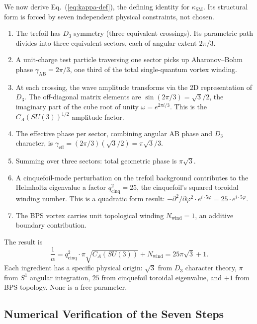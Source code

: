 \documentclass[11pt]{article}
\newcommand{\CA}{C_A}
\newcommand{\ksm}{\kappa_\text{SM}}
\begin{document}
We now derive Eq.~(\ref{eq:kappa-def}), the defining identity
for $\ksm$.  Its structural form is forced by seven independent
physical constraints, not chosen.

\begin{enumerate}
\item
  The trefoil has $D_3$ symmetry (three equivalent crossings).
  Its parametric path divides into three equivalent sectors, each
  of angular extent $2\pi/3$.
\item
  A unit-charge test particle traversing one sector picks up
  Aharonov--Bohm phase $\gamma_\text{AB} = 2\pi/3$, one third of the
  total single-quantum vortex winding.
\item
  At each crossing, the wave amplitude transforms via the 2D
  representation of $D_3$.  The off-diagonal matrix elements are
  $\sin(2\pi/3) = \sqrt{3}/2$, the imaginary part of the cube root
  of unity $\omega = e^{2\pi i/3}$.  This is the $\CA(SU(3))^{1/2}$
  amplitude factor.
\item
  The effective phase per sector, combining angular AB phase and
  $D_3$ character, is $\gamma_\text{eff} = (2\pi/3)(\sqrt{3}/2)
  = \pi\sqrt{3}/3$.
\item
  Summing over three sectors: total geometric phase is
  $\pi\sqrt{3}$.
\item
  A cinquefoil-mode perturbation on the trefoil background
  contributes to the Helmholtz eigenvalue a factor
  $q^2_\text{cinq} = 25$, the cinquefoil's squared toroidal
  winding number.  This is a quadratic form result:
  $-\partial^2/\partial\varphi^2 \cdot e^{i\cdot 5\varphi}
  = 25 \cdot e^{i\cdot 5\varphi}$.
\item
  The BPS vortex carries unit topological winding $N_\text{wind}=1$,
  an additive boundary contribution.
\end{enumerate}

The result is
\begin{equation}
  \frac{1}{\alpha} = q_\text{cinq}^2 \cdot \pi \sqrt{\CA(SU(3))}
  + N_\text{wind} = 25\pi\sqrt{3} + 1.
\end{equation}
Each ingredient has a specific physical origin:
$\sqrt{3}$ from $D_3$ character theory, $\pi$ from $S^1$
angular integration, $25$ from cinquefoil toroidal eigenvalue, and
$+1$ from BPS topology.  None is a free parameter.

\subsection{Numerical Verification of the Seven Steps}
\label{sec:ab-verification}
\end{document}

